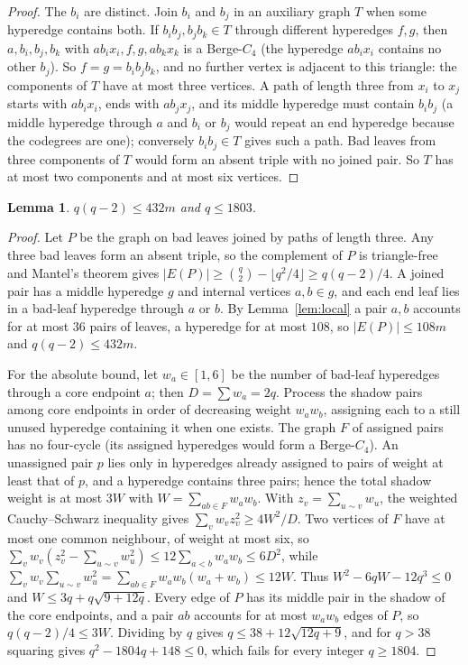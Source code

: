 \documentclass[11pt]{article}
\newtheorem{lemma}[theorem]{Lemma}
\theoremstyle{remark}
\begin{document}
\begin{proof}
The $b_i$ are distinct. Join $b_i$ and $b_j$ in an auxiliary graph $T$
when some hyperedge contains both. If $b_ib_j,b_jb_k\in T$ through
different hyperedges $f,g$, then $a,b_i,b_j,b_k$ with $ab_ix_i,f,g,ab_kx_k$
is a Berge-$C_4$ (the hyperedge $ab_ix_i$ contains no other $b_j$). So $f=g=
b_ib_jb_k$, and no further vertex is adjacent to this triangle: the
components of $T$ have at most three vertices. A path of length three
from $x_i$ to $x_j$ starts with $ab_ix_i$, ends with $ab_jx_j$, and its
middle hyperedge must contain $b_ib_j$ (a middle hyperedge through $a$
and $b_i$ or $b_j$ would repeat an end hyperedge because the codegrees are
one); conversely $b_ib_j\in T$ gives such a path. Bad leaves from three
components of $T$ would form an absent triple with no joined pair. So $T$
has at most two components and at most six vertices.
\end{proof}

\begin{lemma}\label{lem:sqrt}
$q(q-2)\le432m$ and $q\le1803$.
\end{lemma}

\begin{proof}
Let $P$ be the graph on bad leaves joined by paths of length three. Any
three bad leaves form an absent triple, so the complement of $P$ is
triangle-free and Mantel's theorem gives $|E(P)|\ge\binom q2-\lfloor
q^2/4\rfloor\ge q(q-2)/4$. A joined pair has a middle hyperedge $g$ and
internal vertices $a,b\in g$, and each end leaf lies in a bad-leaf
hyperedge through $a$ or $b$. By Lemma~\ref{lem:local} a pair $a,b$
accounts for at most $36$ pairs of leaves, a hyperedge for at most
$108$, so $|E(P)|\le108m$ and $q(q-2)\le432m$.

For the absolute bound, let $w_a\in[1,6]$ be the number of bad-leaf
hyperedges through a core endpoint $a$; then $D=\sum w_a=2q$. Process the
shadow pairs among core endpoints in order of decreasing weight $w_aw_b$,
assigning each to a still unused hyperedge containing it when one exists.
The graph $F$ of assigned pairs has no four-cycle (its assigned hyperedges
would form a Berge-$C_4$). An unassigned pair $p$ lies only in hyperedges
already assigned to pairs of weight at least that of $p$, and a
hyperedge contains three pairs; hence the total shadow weight is at most
$3W$ with $W=\sum_{ab\in F}w_aw_b$. With $z_v=\sum_{u\sim v}w_u$, the
weighted Cauchy--Schwarz inequality gives $\sum_vw_vz_v^2\ge4W^2/D$. Two
vertices of $F$ have at most one common neighbour, of weight at most six,
so $\sum_vw_v(z_v^2-\sum_{u\sim v}w_u^2)\le 12\sum_{a<b}w_aw_b\le6D^2$,
while $\sum_vw_v\sum_{u\sim v}w_u^2=\sum_{ab\in F}w_aw_b(w_a+w_b)\le12W$.
Thus $W^2-6qW-12q^3\le0$ and $W\le3q+q\sqrt{9+12q}$. Every edge of $P$ has
its middle pair in the shadow of the core endpoints, and a pair $ab$
accounts for at most $w_aw_b$ edges of $P$, so $q(q-2)/4\le3W$. Dividing
by $q$ gives $q\le38+12\sqrt{12q+9}$, and for $q>38$ squaring gives
$q^2-1804q+148\le0$, which fails for every integer $q\ge1804$.
\end{proof}
\end{document}
